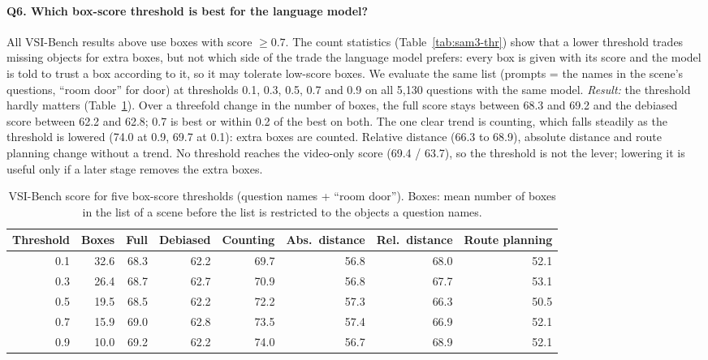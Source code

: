 \paragraph{Q6. Which box-score threshold is best for the language model?}
All VSI-Bench results above use boxes with score $\geq 0.7$. The count statistics
(Table~\ref{tab:sam3-thr}) show that a lower threshold trades missing objects for extra boxes, but not which side
of the trade the language model prefers: every box is given with its score and the model is told to trust a box
according to it, so it may tolerate low-score boxes. We evaluate the same list (prompts = the names in the
scene's questions, ``room door'' for door) at thresholds 0.1, 0.3, 0.5, 0.7 and 0.9 on all 5,130 questions with
the same model.
\emph{Result:} the threshold hardly matters (Table~\ref{tab:sam3-q6}). Over a threefold change in the
number of boxes, the full score stays between 68.3 and 69.2 and the debiased score between 62.2 and 62.8; 0.7 is
best or within 0.2 of the best on both. The one clear trend is counting, which falls steadily as the threshold
is lowered (74.0 at 0.9, 69.7 at 0.1): extra boxes are counted. Relative distance (66.3 to 68.9), absolute distance and
route planning change without a trend. No threshold reaches the video-only score (69.4 / 63.7), so the
threshold is not the lever; lowering it is useful only if a later stage removes the extra boxes.

\begin{table}[t]
\centering
\caption{VSI-Bench score for five box-score thresholds (question names + ``room door''). Boxes: mean number of
boxes in the list of a scene before the list is restricted to the objects a question names.}
\label{tab:sam3-q6}
\begin{tabular}{rrrrrrrr}
\toprule
Threshold & Boxes & Full & Debiased & Counting & Abs.\ distance & Rel.\ distance & Route planning \\
\midrule
0.1 & 32.6 & 68.3 & 62.2 & 69.7 & 56.8 & 68.0 & 52.1 \\
0.3 & 26.4 & 68.7 & 62.7 & 70.9 & 56.8 & 67.7 & 53.1 \\
0.5 & 19.5 & 68.5 & 62.2 & 72.2 & 57.3 & 66.3 & 50.5 \\
0.7 & 15.9 & 69.0 & 62.8 & 73.5 & 57.4 & 66.9 & 52.1 \\
0.9 & 10.0 & 69.2 & 62.2 & 74.0 & 56.7 & 68.9 & 52.1 \\
\bottomrule
\end{tabular}
\end{table}

